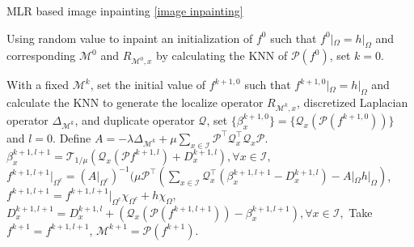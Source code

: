 \documentclass[letterpaper,10pt]{article}
\begin{document}
\begin{algorithm}

\caption{MLR based image inpainting \eqref{image inpainting}}
\label{alg:Inpainting}
\begin{algorithmic}
 Using random value to inpaint an initialization of $f^0$ such that $f^0|_\Omega = h|_\Omega$ and corresponding $\mathcal{M}^0$ and $R_{\mathcal{M}^0,x}$ by calculating the KNN of $\mathcal{P}(f^0)$, set $k=0$.

 With a fixed $\mathcal{M}^k$, set the initial value of $f^{k+1,0}$ such that $f^{k+1,0}|_\Omega = h|_\Omega$ and calculate the KNN to generate the localize operator $R_{\mathcal{M}^k,x}$, discretized Laplacian operator $\Delta_{\mathcal{M}^k}$, and duplicate operator $\mathcal{Q}$, set $\{\beta_x^{k+1,0}\} = \{\mathcal{Q}_x (\mathcal{P} (f^{k+1,0}))\}$ and $l=0$. Define $A = - \lambda \Delta_{\mathcal{M}^k}  + \mu \sum\limits_{x \in \mathscr{I}} \mathcal{P}^{\top}\mathcal{Q}_x^{\top}\mathcal{Q}_x \mathcal{P}$.
 $\beta_x^{k+1,l+1} = \mathcal{T}_{1/\mu} (\mathcal{Q}_x (\mathcal{P} f^{k+1,l}) +D_x^{k+1,l}), \forall x \in \mathscr{I},$
 $f^{k+1,l+1}|_{\Omega^c} =  (A|_{\Omega^c})^{-1} (\mu \mathcal{P}^{\top} ( \sum\limits_{x \in \mathscr{I}}  \mathcal{Q}_x^{\top}( {\beta}_x^{k+1,l+1} -D_x^{k+1,l}) - A|_\Omega h|_\Omega)$,
 $f^{k+1,l+1} = f^{k+1,l+1}|_{\Omega^c} \chi_{\Omega^c} + h \chi_{\Omega},$
 $D_{x}^{k+1,l+1} = D_{x}^{k+1,l} + (\mathcal{Q}_x(\mathcal{P}(f^{k+1,l+1}))-\beta_x^{k+1,l+1}), \forall x \in \mathscr{I},$
\ENDWHILE
{} Take $f^{k+1} = f^{k+1,l+1}$,
 $\mathcal{M}^{k+1} = \mathcal{P}(f^{k+1})$.
\ENDWHILE

\end{algorithmic}
\end{algorithm}
\end{document}
